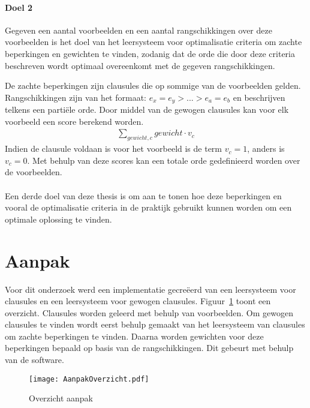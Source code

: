 \begin{framed}
  \noindent
  \begin{minipage}{\textwidth}
    \paragraph*{Doel 2}
    Gegeven een aantal voorbeelden en een aantal rangschikkingen over deze voorbeelden is het doel van het leersysteem voor optimalisatie criteria om zachte beperkingen en gewichten te vinden, zodanig dat de orde die door deze criteria beschreven wordt optimaal overeenkomt met de gegeven rangschikkingen.
  \end{minipage}
\end{framed}

De zachte beperkingen zijn clausules die op sommige van de voorbeelden gelden.
Rangschikkingen zijn van het formaat: $e_x = e_y > ... > e_a = e_b$ en beschrijven telkens een parti\"ele orde.
Door middel van de gewogen clausules kan voor elk voorbeeld een score berekend worden.
\begin{align*}
  \sum\limits_{\mathit{gewicht}, \mathit{c}} \mathit{gewicht} \cdot v_{c}
\end{align*}
Indien de clausule voldaan is voor het voorbeeld is de term $v_c = 1$, anders is $v_c = 0$.
Met behulp van deze scores kan een totale orde gedefinieerd worden over de voorbeelden.
\\\\
Een derde doel van deze thesis is om aan te tonen hoe deze beperkingen en vooral de optimalisatie criteria in de praktijk gebruikt kunnen worden om een optimale oplossing te vinden.


\section{Aanpak}
Voor dit onderzoek werd een implementatie gecre\"eerd van een leersysteem voor clausules en een leersysteem voor gewogen clausules.
Figuur~\ref{fig:struktuur} toont een overzicht.
Clausules worden geleerd met behulp van voorbeelden.
Om gewogen clausules te vinden wordt eerst behulp gemaakt van het leersysteem van clausules om zachte beperkingen te vinden.
Daarna worden gewichten voor deze beperkingen bepaald op basis van de rangschikkingen.
Dit gebeurt met behulp van de \svm software.

\begin{figure}

  \centering
    \texttt{[image: AanpakOverzicht.pdf]}
  \caption{Overzicht aanpak}
  \label{fig:struktuur}

\end{figure}

